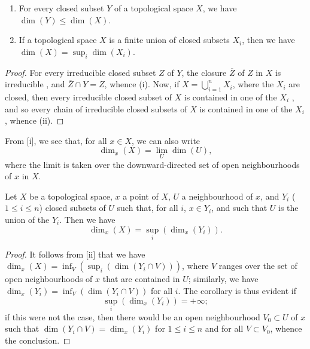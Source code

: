 \begin{prop}[14.1.4]
\label{0.14.1.4}
\medskip\noindent
\begin{enumerate}[label=\emph{(\roman*)}]
  \item For every closed subset $Y$ of a topological space $X$, we have $\dim(Y)\leq\dim(X)$.
  \item If a topological space $X$ is a finite union of closed subsets $X_i$, then we have $\dim(X)=\sup_i\dim(X_i)$.
\end{enumerate}
\end{prop}

\begin{proof}
\label{proof-0.14.1.4}
For every irreducible closed subset $Z$ of $Y$, the closure $\overline{Z}$ of $Z$ in $X$ is irreducible , and $\overline{Z}\cap Y=Z$, whence (i).
Now, if $X=\bigcup_{i=1}^nX_i$, where the $X_i$ are closed, then every irreducible closed subset of $X$ is contained in one of the $X_i$ , and so every chain of irreducible closed subsets of $X$ is contained in one of the $X_i$, whence (ii).
\end{proof}

From [i], we see that, for all $x\in X$, we can also write
\[
\label{0.14.1.4.1}
  \dim_x(X)=\lim_U\dim(U),
  \tag{14.1.4.1}
\]
where the limit is taken over the downward-directed set of open neighbourhoods of $x$ in $X$.

\begin{cor}[14.1.5]
\label{0.14.1.5}
Let $X$ be a topological space, $x$ a point of $X$, $U$ a neighbourhood of $x$, and $Y_i$ ($1\leq i\leq n$) closed subsets of $U$ such that, for all $i$, $x\in Y_i$, and such that $U$ is the union of the $Y_i$.
Then we have
\[
\label{0.14.1.5.1}
  \dim_x(X)=\sup_i(\dim_x(Y_i)).
  \tag{14.1.5.1}
\]
\end{cor}

\begin{proof}
\label{proof-0.14.1.5}
It follows from [ii] that we have $\dim_x(X) = \inf_V(\sup_i(\dim(Y_i\cap V)))$, where $V$ ranges over the set of open neighbourhoods of $x$ that are contained in $U$;
similarly, we have $\dim_x(Y_i) = \inf_V(\dim(Y_i\cap V))$ for all $i$.
The corollary is thus evident if
\[
  \sup_i(\dim_x(Y_i))=+\infty;
\]
if this were not the case, then there would be an open neighbourhood $V_0\subset U$ of $x$ such that $\dim(Y_i\cap V)=\dim_x(Y_i)$ for $1\leq i\leq n$ and for all $V\subset V_0$, whence the conclusion.
\end{proof}

